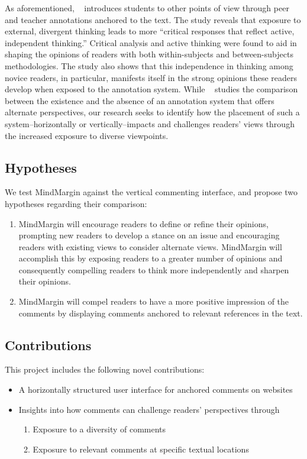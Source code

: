 As aforementioned, ~\cite{AnnotationsStudents} introduces students to other points of view through peer and teacher annotations anchored to the text. The study reveals that exposure to external, divergent thinking leads to more ``critical responses that reflect active, independent thinking.'' Critical analysis and active thinking were found to aid in shaping the opinions of readers with both within-subjects and between-subjects methodologies. The study also shows that this independence in thinking among novice readers, in particular, manifests itself in the strong opinions these readers develop when exposed to the annotation system. While ~\cite{AnnotationsStudents} studies the comparison between the existence and the absence of an annotation system that offers alternate perspectives, our research seeks to identify how the placement of such a system--horizontally or vertically--impacts and challenges readers' views through the increased exposure to diverse viewpoints.

\subsection{Hypotheses}
We test MindMargin against the vertical commenting interface, and propose two hypotheses regarding their comparison:
\begin{enumerate}
\item MindMargin will encourage readers to define or refine their opinions, prompting new readers to develop a stance on an issue and encouraging readers with existing views to consider alternate views. MindMargin will accomplish this by exposing readers to a greater number of opinions and consequently compelling readers to think more independently and sharpen their opinions. 
\item MindMargin will compel readers to have a more positive impression of the comments by displaying comments anchored to relevant references in the text.
\end{enumerate}

\subsection{Contributions}
This project includes the following novel contributions:
\begin{itemize}
\item A horizontally structured user interface for anchored comments on websites
\item Insights into how comments can challenge readers' perspectives through
\begin{enumerate}
\item Exposure to a diversity of comments
\item Exposure to relevant comments at specific textual locations
\end{enumerate}
\end{itemize}

